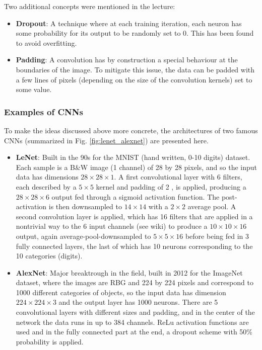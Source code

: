 \documentclass{article}
\begin{document}
\noindent Two additional concepts were mentioned in the lecture:
\begin{itemize}
    \item \textbf{Dropout}: A technique where at each training iteration, each neuron has some probability for its output to be randomly set to 0. This has been found to avoid overfitting.
    \item \textbf{Padding}: A convolution has by construction a special behaviour at the boundaries of the image. To mitigate this issue, the data can be padded with a few lines of pixels (depending on the size of the convolution kernels) set to some value.
\end{itemize}

\subsubsection*{Examples of CNNs}
To make the ideas discussed above more concrete, the architectures of two famous CNNs (summarized in Fig. \ref{fig:lenet_alexnet}) are presented here.
\begin{itemize}
    \item \textbf{LeNet}: Built in the 90s for the MNIST (hand written, 0-10 digits) dataset. Each sample is a B\&W image (1 channel) of 28 by 28 pixels, and so the input data has dimensions $28\times 28\times 1$. A first convolutional layer with 6 filters, each described by a $5\times 5$ kernel and padding of 2 , is applied, producing a $28\times 28\times 6$ output fed through a sigmoid activation function. The post-activation is then downsampled to $14\times 14$ with a $2\times 2$ average pool. A second convolution layer is applied, which has 16 filters that are applied in a nontrivial way to the 6 input channels (see wiki) to produce a $10\times 10\times 16$ output, again average-pool-downsampled to $5\times 5\times 16$ before being fed in 3 fully connected layers, the last of which has 10 neurons corresponding to the 10 categories (digits).
    \item \textbf{AlexNet}: Major breaktrough in the field, built in 2012 for the ImageNet dataset, where the images are RBG and 224 by 224 pixels and correspond to 1000 different categories of objects, so the input data has dimension $224\times 224\times 3$ and the output layer has 1000 neurons. There are 5 convolutional layers with different sizes and padding, and in the center of the network the data runs in up to 384 channels. ReLu activation functions are used and in the fully connected part at the end, a dropout scheme with 50\% probability is applied.
\end{itemize}
\end{document}
